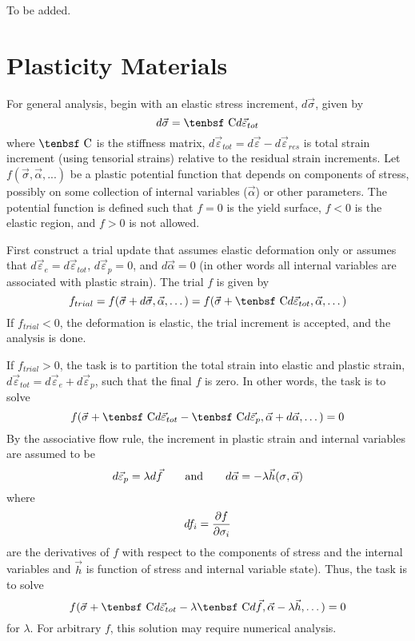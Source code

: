 \documentclass[11pt]{article}
\def\C{\hbox{\tenbsf C}}
\def\del{d \vec{\varepsilon}_{e}}
\def\dpl{d \vec{\varepsilon}_{p}}
\def\deff{d \vec{\varepsilon}_{tot}}
\def\df{d \vec{f}}
\def\da{d\vec{\alpha}}
\def\dsig{d \vec{\sigma}}
\def\s#1{\sigma_{#1}}
\begin{document}
To be added.

\section{Plasticity Materials}

For general analysis, begin with an elastic stress increment, $\dsig$, given by
\begin{equation}
    \dsig = \C \deff 
\end{equation}
where $\C$ is the stiffness matrix, $\deff=d\vec\varepsilon-d\vec\varepsilon_{res}$ is total strain increment (using tensorial strains) relative to the residual strain increments. Let $f(\vec{\sigma},\vec{\alpha},...)$ be a plastic potential function that depends on components of stress, possibly on some collection of internal variables ($\vec{\alpha}$) or other parameters. The potential function is defined such that $f=0$ is the yield surface, $f<0$ is the elastic region, and $f>0$ is not allowed.

First construct a trial update that assumes elastic deformation only or assumes that $\del=\deff$, $\dpl=0$, and $d\vec\alpha=0$ (in other words all internal variables are associated with plastic strain). The trial $f$ is given by\begin{equation}
       f_{trial} = f(\vec\s{} + \dsig,\vec\alpha,\dots) = f(\vec\s{} + \C \deff ,\vec\alpha,\dots)
\end{equation}
If $f_{trial}<0$, the deformation is elastic, the trial increment is accepted, and the analysis is done.

If $f_{trial}>0$, the task is to partition the total strain into elastic and plastic strain, $\deff=\del+\dpl$, such that the final $f$ is zero. In other words, the task is to solve
\begin{equation}
     f(\vec\s{} + \C \deff  - \C\dpl,\vec\alpha + \da,\dots) = 0
\end{equation}
By the associative flow rule, the increment in plastic strain and internal variables are assumed to be 
\begin{equation}
      \dpl = \lambda\df   \qquad {\rm and}\qquad \da = -\lambda \vec h(\s{},\vec\alpha)
\end{equation}
where
\begin{equation}
      df_i = {\partial f\over \partial\sigma_i}   
\end{equation}
are the derivatives of $f$ with respect to the components of stress and the internal variables and $\vec h$ is function of stress and internal variable state). Thus, the task is to solve
\begin{equation}
     f(\vec\s{} + \C \deff - \lambda\C\df,\vec\alpha -\lambda \vec h,\dots) = 0
\end{equation}
for $\lambda$. For arbitrary $f$, this solution may require numerical analysis.
\end{document}
